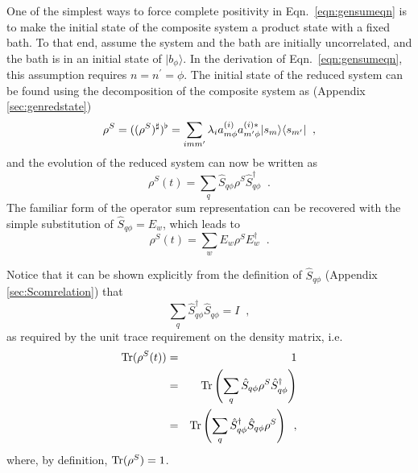 One of the simplest ways to force complete positivity in Eqn.\ \ref{eqn:gensumeqn} is to make the initial state of the composite system a product state with a fixed bath.  To that end, assume the system and the bath are initially uncorrelated, and the bath is in an initial state of $|b_\phi\rangle$.  In the derivation of Eqn.\ \ref{eqn:gensumeqn}, this assumption requires $n=n^\prime = \phi$.  The initial state of the reduced system can be found using the decomposition of the composite system as (Appendix \ref{sec:genredstate})
$$
\rho^S = ((\rho^{S})^\sharp)^\flat = \sum_{imm^\prime} \lambda_i a_{m\phi}^{(i)} a_{m^\prime \phi}^{(i)*} |s_m\rangle\langle s_{m^\prime}|\;\;,
$$
and the evolution of the reduced system can now be written as
$$
\rho^S(t) = \sum_{q} \hat{S}_{q\phi} \rho^S \hat{S}_{q\phi}^\dagger\;\;.
$$
The familiar form of the operator sum representation can be recovered with the simple substitution of $\hat{S}_{q\phi} = E_w$, which leads to
$$
\rho^S(t) = \sum_{w} E_{w} \rho^S E_{w}^\dagger\;\;.
$$

Notice that it can be shown explicitly from the definition of $\hat{S}_{q\phi}$ (Appendix \ref{sec:Scomrelation}) that
$$
\sum_q \hat{S}_{q\phi}^\dagger \hat{S}_{q\phi} = I\;\;,
$$
as required by the unit trace requirement on the density matrix, i.e.
\begin{eqnarray}
\operatorname{Tr}(\rho^S(t)) &=& 1\\
&=& \operatorname{Tr}\left( \sum_{q} \hat{S}_{q\phi} \rho^S \hat{S}_{q\phi}^\dagger \right)\\
&=& \operatorname{Tr}\left( \sum_{q} \hat{S}_{q\phi}^\dagger \hat{S}_{q\phi} \rho^S \right)\;\;,
\end{eqnarray}
where, by definition, $\operatorname{Tr}(\rho^S) = 1$.


